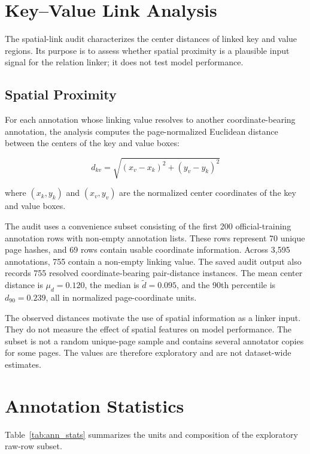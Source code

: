 \section{Key--Value Link Analysis}
\label{sec:kv_analysis}

The spatial-link audit characterizes the center distances of linked key and
value regions. Its purpose is to assess whether spatial proximity is a
plausible input signal for the relation linker; it does not test model
performance.

\subsection{Spatial Proximity}

For each annotation whose linking value resolves to another
coordinate-bearing annotation, the analysis computes the page-normalized
Euclidean distance between the centers of the key and value boxes:

\begin{equation}
d_{kv} = \sqrt{(x_v - x_k)^2 + (y_v - y_k)^2}
\end{equation}

where $(x_k, y_k)$ and $(x_v, y_v)$ are the normalized center coordinates of the key and value boxes.

The audit uses a convenience subset consisting of the first 200
official-training annotation rows with non-empty annotation lists. These rows
represent 70 unique page hashes, and 69 rows contain usable coordinate
information. Across 3{,}595 annotations, 755 contain a non-empty linking
value. The saved audit output also records 755 resolved coordinate-bearing
pair-distance instances. The mean center distance is
$\mu_d = 0.120$, the median is $\tilde{d} = 0.095$, and the 90th percentile
is $d_{90} = 0.239$, all in normalized page-coordinate units.

The observed distances motivate the use of spatial information as a linker
input. They do not measure the effect of spatial features on model
performance. The subset is not a random unique-page sample and contains
several annotator copies for some pages. The values are therefore exploratory
and are not dataset-wide estimates.

\section{Annotation Statistics}
\label{sec:annotation_stats}

Table~\ref{tab:ann_stats} summarizes the units and composition of the
exploratory raw-row subset.

